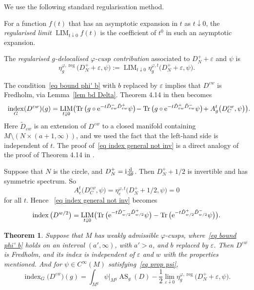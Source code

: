 \documentclass[10pt,a4paper]{amsart}
\numberwithin{equation}{section}
\newtheorem{Theorem}{Theorem}[section]
\DeclareMathOperator{\Tr}{Tr}
\DeclareMathOperator{\AS}{AS}
\DeclareMathOperator{\ind}{index}
\DeclareMathOperator{\reg}{reg}
\DeclareMathOperator{\LIM}{LIM}
\begin{document}
We use the following standard regularisation method.
\begin{Definition}
For a function $f(t)$ that has an asymptotic expansion in $t$ as $t \downarrow 0$, the \emph{regularised limit} $\LIM_{t \downarrow 0}f(t)$ is
the coefficient of $t^0$ in such an asymptotic expansion.

The \emph{regularised $g$-delocalised $\varphi$-cusp contribution} associated to $D_N^+ + \varepsilon$ and $\psi$ is
\[
\eta_g^{\varphi, \reg}\big(D_N^+ + \varepsilon, \psi\big) := \LIM_{t \downarrow 0} \eta_g^{\varphi, t}\big(D_N^+ + \varepsilon, \psi\big).
\]
\end{Definition}

 The condition~\eqref{eq bound phi' b} with $b$ replaced by $\varepsilon$ implies that $D^{\varepsilon w}$ is Fredholm, via Lemma~\ref{lem bd Delta}.
Theorem 4.14 in \cite{HW21a} then becomes
 \begin{gather} \label{eq index general not inv}
 \ind_G(D^{\varepsilon w})(g) = \LIM_{t\downarrow 0} \bigl(
 \Tr\big(g\circ {\rm e}^{-t\tilde D^-_{\varepsilon w} \tilde D^+_{\varepsilon w}}\psi\big)\! - \Tr\big(g\circ {\rm e}^{-t\tilde D^+_{\varepsilon w} \tilde D^-_{\varepsilon w}}\psi\big)\! + A_{g}^t\big(D_C^{\varepsilon w}, \psi\big) \bigr).\!\!\!\!
 \end{gather}
 Here $\tilde D_{\varepsilon w}$ is an extension of $D^{\varepsilon w}$ to a closed manifold containing $M \setminus (N \times (a+1, \infty))$,
and we used the fact that the left-hand side is independent of $t$. The proof of~\eqref{eq index general not inv} is a direct analogy of the proof of Theorem 4.14 in \cite{HW21a}.
 \begin{Example}
 Suppose that $N$ is the circle, and $D_N^+ = {\rm i}\frac{{\rm d}}{{\rm d}\theta}$. Then $D_N^+ + 1/2$ is invertible and has symmetric spectrum.
 So
 \[
 A_{e}^t\big(D_C^{\varepsilon w}, \psi\big) = \eta^{\varphi, t}_{e}\big(D_N^++1/2, \psi\big) = 0
 \]
 for all $t$. Hence
~\eqref{eq index general not inv} becomes
 \[
 \ind\big(D^{w/2}\big) = \LIM_{t\downarrow 0} \bigl(
 \Tr\big({\rm e}^{-t\tilde D^-_{ w/2} \tilde D^+_{w/2}}\psi\big) - \Tr\big({\rm e}^{-t\tilde D^+_{w/2} \tilde D^-_{w/2}}\psi\big) \bigr).
 \]
 \end{Example}

\begin{Theorem}\label{thm index non invtble}
Suppose that $M$ has weakly admissible $\varphi$-cusps, where~\eqref{eq bound phi' b} holds on an interval $(a', \infty)$, with $a'>a$, and $b$ replaced by $\varepsilon$.
Then $D^{\varepsilon w}$ is Fredholm, and its index is independent of $\varepsilon$ and $w$ with the properties mentioned.
And for $\psi \in C^{\infty}(M)$ satisfying~\eqref{eq prop psi},
 \begin{equation} \label{eq index non invtble}
\ind_G\big(D^{\varepsilon w}\big)(g) = \int_{M^g} \psi|_{M^g} \AS_g(D)
-\frac{1}{2} \lim_{\varepsilon \downarrow 0}\eta^{\varphi, \reg}_g\big(D_N^+ +\varepsilon, \psi\big).
\end{equation}
\end{Theorem}
\end{document}
